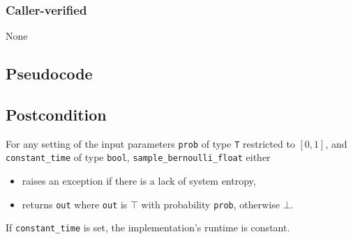 \documentclass{article}
\begin{document}
\subsubsection*{Caller-verified}
None

\subsection*{Pseudocode}



\subsection*{Postcondition}

\begin{theorem}
    \label{sample-bernoulli}
    For any setting of the input parameters
    \texttt{prob} of type \texttt{T} restricted to $[0, 1]$,
    and \texttt{constant\_time} of type \texttt{bool},
    \texttt{sample\_bernoulli\_float} either
    \begin{itemize}
        \item raises an exception if there is a lack of system entropy,
        \item returns \texttt{out} where \texttt{out} is $\top$ with probability \texttt{prob}, otherwise $\bot$.
    \end{itemize}
     If \texttt{constant\_time} is set, the implementation's runtime is constant.
\end{theorem}
\end{document}
